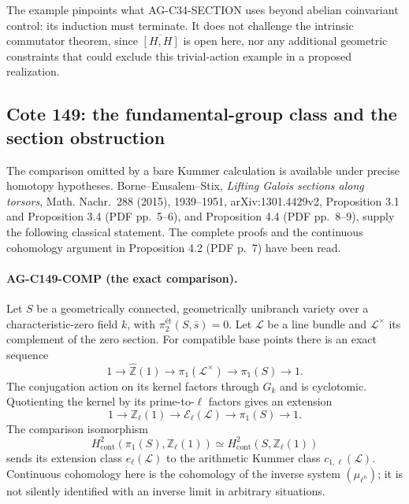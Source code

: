 \documentclass[11pt,a4paper]{article}
\begin{document}
The example pinpoints what AG-C34-SECTION uses beyond abelian
coinvariant control: its induction must terminate. It does not challenge
the intrinsic commutator theorem, since $\overline{[H,H]}$ is open
here, nor any additional geometric constraints that could exclude this
trivial-action example in a proposed realization.

\subsection{Cote 149: the fundamental-group class and the section obstruction}
\label{ag:c149-comparison}

The comparison omitted by a bare Kummer calculation is available under
precise homotopy hypotheses. Borne--Emsalem--Stix,
\emph{Lifting Galois sections along torsors}, Math. Nachr.~288 (2015),
1939--1951, arXiv:1301.4429v2, Proposition 3.1 and Proposition 3.4
(PDF pp.~5--6), and Proposition 4.4 (PDF pp.~8--9), supply the
following classical statement. The complete proofs and the continuous
cohomology argument in Proposition 4.2 (PDF p.~7) have been read.

\paragraph{AG-C149-COMP (the exact comparison).}
Let $S$ be a geometrically connected, geometrically unibranch variety
over a characteristic-zero field $k$, with
$\pi^{\text{ét}}_2(S,\bar s)=0$. Let $\mathcal L$ be a line
bundle and $\mathcal L^\times$ its complement of the zero section.
For compatible base points there is an exact sequence
\[
 1\longrightarrow\widehat{\mathbb Z}(1)
 \longrightarrow\pi_1(\mathcal L^\times)
 \longrightarrow\pi_1(S)\longrightarrow1.
\]
The conjugation action on its kernel factors through $G_k$ and is
cyclotomic. Quotienting the kernel by its prime-to-$\ell$ factors gives
an extension
\begin{equation}\label{eq:ag-c149-extension}
 1\longrightarrow\mathbb Z_\ell(1)
 \longrightarrow\mathcal E_\ell(\mathcal L)
 \longrightarrow\pi_1(S)\longrightarrow1.
\end{equation}
The comparison isomorphism
\[
 H^2_{\mathrm{cont}}(\pi_1(S),\mathbb Z_\ell(1))
 \simeq H^2_{\mathrm{cont}}(S,\mathbb Z_\ell(1))
\]
sends its extension class $e_\ell(\mathcal L)$ to the arithmetic
Kummer class $c_{1,\ell}(\mathcal L)$. Continuous cohomology here is
the cohomology of the inverse system $(\mu_{\ell^n})$; it is not
silently identified with an inverse limit in arbitrary situations.
\end{document}
